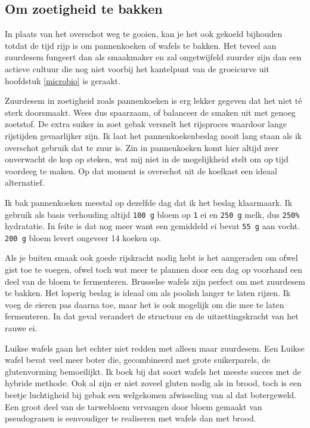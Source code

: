 \documentclass[
  11pt,
  dutch,
]{memoir}
\begin{document}
\hypertarget{om-zoetigheid-te-bakken}{%
\subsection{Om zoetigheid te bakken}\label{om-zoetigheid-te-bakken}}

In plaats van het overschot weg te gooien, kan je het ook gekoeld
bijhouden totdat de tijd rijp is om pannenkoeken of wafels te bakken.
Het teveel aan zuurdesem fungeert dan als smaakmaker en zal ongetwijfeld
zuurder zijn dan een actieve cultuur die nog niet voorbij het kantelpunt
van de groeicurve uit hoofdstuk \ref{microbio} is geraakt.

Zuurdesem in zoetigheid zoals pannenkoeken is erg lekker gegeven dat het
niet té sterk doorsmaakt. Wees dus spaarzaam, of balanceer de smaken uit
met genoeg zoetstof. De extra suiker in zoet gebak versnelt het
rijsproces waardoor lange rijstijden gevaarlijker zijn. Ik laat het
pannenkoekenbeslag nooit lang staan als ik overschot gebruik dat te zuur
is. Zin in pannenkoeken komt hier altijd zeer onverwacht de kop op
steken, wat mij niet in de mogelijkheid stelt om op tijd voordeeg te
maken. Op dat moment is overschot uit de koelkast een ideaal
alternatief.

Ik bak pannenkoeken meestal op dezelfde dag dat ik het beslag
klaarmaark. Ik gebruik als basis verhouding altijd \texttt{100\ g} bloem
op \texttt{1} ei en \texttt{250\ g} melk, dus \texttt{250\%} hydratatie.
In feite is dat nog meer want een gemiddeld ei bevat \texttt{55\ g} aan
vocht. \texttt{200\ g} bloem levert ongeveer 14 koeken op.

Als je buiten smaak ook goede rijskracht nodig hebt is het aangeraden om
ofwel gist toe te voegen, ofwel toch wat meer te plannen door een dag op
voorhand een deel van de bloem te fermenteren. Brusselse wafels zijn
perfect om met zuurdesem te bakken. Het loperig beslag is ideaal om als
poolish langer te laten rijzen. Ik voeg de eieren pas daarna toe, maar
het is ook mogelijk om die mee te laten fermenteren. In dat geval
verandert de structuur en de uitzettingskracht van het rauwe ei.

Luikse wafels gaan het echter niet redden met alleen maar zuurdesem. Een
Luikse wafel bevat veel meer boter die, gecombineerd met grote
suikerparels, de glutenvorming bemoeilijkt. Ik boek bij dat soort wafels
het meeste succes met de hybride methode. Ook al zijn er niet zoveel
gluten nodig als in brood, toch is een beetje luchtigheid bij gebak een
welgekomen afwisseling van al dat botergeweld. Een groot deel van de
tarwebloem vervangen door bloem gemaakt van pseudogranen is eenvoudiger
te realiseren met wafels dan met brood.
\end{document}
